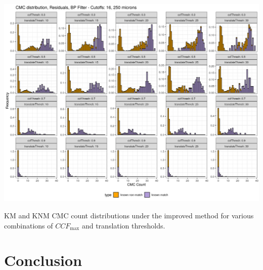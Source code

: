 \begin{widefigure}[htbp]
  \centering
	\includegraphics[width = \linewidth]{./images/cmcResidualsBP16_250_corr30-90_trans10-30_noAUC.png}
	\caption{KM and KNM CMC count distributions under the improved method for various combinations of $CCF_{\max}$ and translation thresholds.}
 	\label{figure:improvedMethodSensitivity}
\end{widefigure}

\section{Conclusion}




%

\address{Joseph Zemmels\\
  Iowa State University Department of Statistics\\
  Address\\
  Unites States\\
  (ORCiD if desired)\\
  }

\address{Heike Hofmann\\
  Iowa State University Department of Statistics\\
  Address\\
  United States\\
  (ORCiD if desired)\\
  }

\address{Susan VanderPlas\\
  University of Nebraska - Lincoln Department of Statistics\\
  Address\\
  United States\\
  (ORCiD if desired)\\
  }
